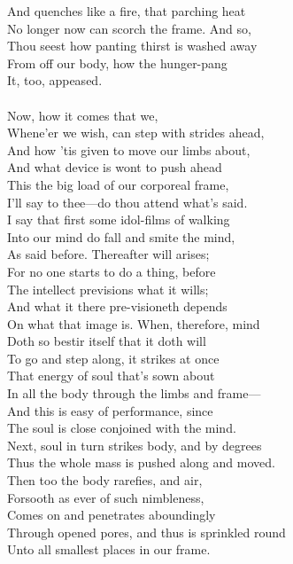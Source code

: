 And quenches like a fire, that parching heat\\
No longer now can scorch the frame. And so,\\
Thou seest how panting thirst is washed away\\
From off our body, how the hunger-pang\\
It, too, appeased.\\
\\
Now, how it comes that we,\\
Whene'er we wish, can step with strides ahead,\\
And how 'tis given to move our limbs about,\\
And what device is wont to push ahead\\
This the big load of our corporeal frame,\\
I'll say to thee—do thou attend what's said.\\
I say that first some idol-films of walking\\
Into our mind do fall and smite the mind,\\
As said before. Thereafter will arises;\\
For no one starts to do a thing, before\\
The intellect previsions what it wills;\\
And what it there pre-visioneth depends\\
On what that image is. When, therefore, mind\\
Doth so bestir itself that it doth will\\
To go and step along, it strikes at once\\
That energy of soul that's sown about\\
In all the body through the limbs and frame—\\
And this is easy of performance, since\\
The soul is close conjoined with the mind.\\
Next, soul in turn strikes body, and by degrees\\
Thus the whole mass is pushed along and moved.\\
Then too the body rarefies, and air,\\
Forsooth as ever of such nimbleness,\\
Comes on and penetrates aboundingly\\
Through opened pores, and thus is sprinkled round\\
Unto all smallest places in our frame.\\
